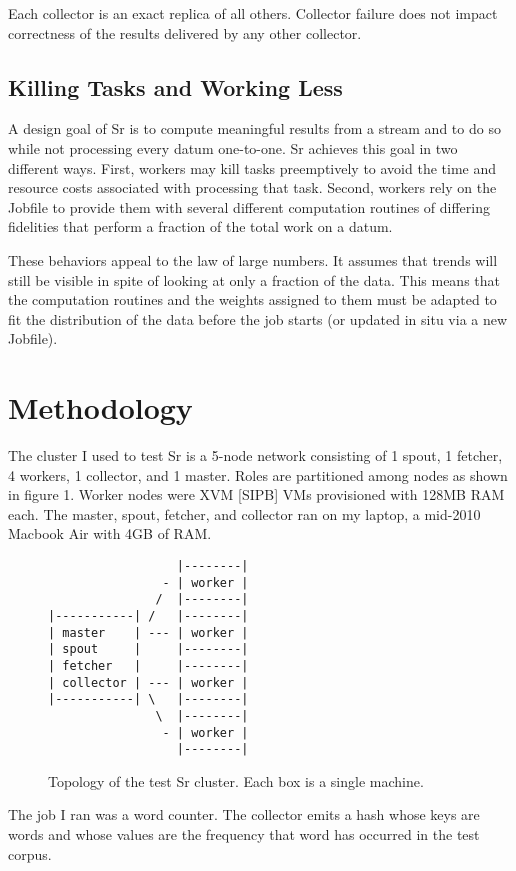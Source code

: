 \documentclass[12pt]{article}
\begin{document}
Each collector is an exact replica of all others. Collector failure does not impact correctness of the results delivered by any other collector.
\subsection{Killing Tasks and Working Less}
A design goal of Sr is to compute meaningful results from a stream and to do so while not processing every datum one-to-one. Sr achieves this goal in two different ways. First, workers may kill tasks preemptively to avoid the time and resource costs associated with processing that task. Second, workers rely on the Jobfile to provide them with several different computation routines of differing fidelities that perform a fraction of the total work on a datum.

These behaviors appeal to the law of large numbers. It assumes that trends will still be visible in spite of looking at only a fraction of the data. This means that the computation routines and the weights assigned to them must be adapted to fit the distribution of the data before the job starts (or updated in situ via a new Jobfile).

\section{Methodology}
The cluster I used to test Sr is a 5-node network consisting of 1 spout, 1 fetcher, 4 workers, 1 collector, and 1 master. Roles are partitioned among nodes as shown in figure 1. Worker nodes were XVM [SIPB] VMs provisioned with 128MB RAM each. The master, spout, fetcher, and collector ran on my laptop, a mid-2010 Macbook Air with 4GB of RAM.

\begin{figure}
\begin{verbatim}
                  |--------|
                - | worker |
               /  |--------|
|-----------| /   |--------|
| master    | --- | worker |
| spout     |     |--------|
| fetcher   |     |--------|
| collector | --- | worker |
|-----------| \   |--------|
               \  |--------|
                - | worker |
                  |--------|

\end{verbatim}
\caption{Topology of the test Sr cluster. Each box is a single machine.}
\end{figure}

The job I ran was a word counter. The collector emits a hash whose keys are words and whose values are the frequency that word has occurred in the test corpus.
\end{document}
